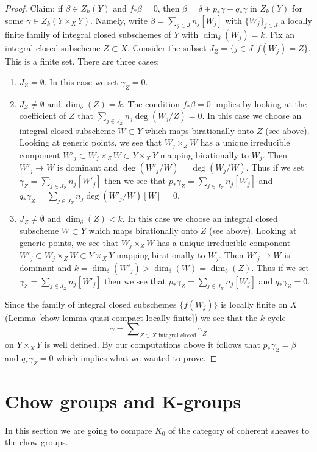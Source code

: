 \begin{proof}
\medskip\noindent
Claim: if $\beta \in Z_k(Y)$ and $f_*\beta = 0$, then
$\beta = \delta + p_*\gamma - q_*\gamma$ in $Z_k(Y)$ for some
$\gamma \in Z_k(Y \times_X Y)$. Namely, write $\beta = \sum_{j \in J} n_j[W_j]$
with $\{W_j\}_{j \in J}$ a locally finite family of integral closed
subschemes of $Y$ with $\dim_\delta(W_j) = k$.
Fix an integral closed subscheme $Z \subset X$. Consider the subset
$J_Z = \{j \in J : f(W_j) = Z\}$. This is a finite set. There are three
cases:
\begin{enumerate}
\item $J_Z = \emptyset$. In this case we set $\gamma_Z = 0$.
\item $J_Z \not = \emptyset$ and $\dim_\delta(Z) = k$.
The condition $f_*\beta = 0$ implies by looking at the
coefficient of $Z$ that $\sum_{j \in J_Z} n_j\deg(W_j/Z) = 0$.
In this case we choose an integral closed subscheme $W \subset Y$
which maps birationally onto $Z$ (see above). Looking at generic
points, we see that $W_j \times_Z W$ has a unique irreducible
component $W'_j \subset W_j \times_Z W \subset Y \times_X Y$
mapping birationally to $W_j$. Then $W'_j \to W$ is dominant
and $\deg(W'_j/W) = \deg(W_j/W)$. Thus if we set
$\gamma_Z = \sum_{j \in J_Z} n_j[W'_j]$
then we see that
$p_*\gamma_Z = \sum_{j \in J_Z} n_j[W_j]$ and
$q_*\gamma_Z = \sum_{j \in J_Z} n_j\deg(W'_j/W)[W] = 0$.
\item $J_Z \not = \emptyset$ and $\dim_\delta(Z) < k$.
In this case we choose an integral closed subscheme $W \subset Y$
which maps birationally onto $Z$ (see above). Looking at generic
points, we see that $W_j \times_Z W$ has a unique irreducible
component $W'_j \subset W_j \times_Z W \subset Y \times_X Y$
mapping birationally to $W_j$. Then $W'_j \to W$ is dominant
and $k = \dim_\delta(W'_j) > \dim_\delta(W) = \dim_\delta(Z)$.
Thus if we set $\gamma_Z = \sum_{j \in J_Z} n_j[W'_j]$
then we see that
$p_*\gamma_Z = \sum_{j \in J_Z} n_j[W_j]$ and
$q_*\gamma_Z = 0$.
\end{enumerate}
Since the family of integral closed subschemes $\{f(W_j)\}$
is locally finite on $X$
(Lemma \ref{chow-lemma-quasi-compact-locally-finite})
we see that the $k$-cycle
$$
\gamma = \sum\nolimits_{Z \subset X\text{ integral closed}} \gamma_Z
$$
on $Y \times_X Y$ is well defined. By our computations above it follows that
$p_*\gamma_Z = \beta$ and $q_*\gamma_Z = 0$ which implies
what we wanted to prove.
\end{proof}

\section{Chow groups and K-groups}
\label{chow-section-chow-and-K}
In this section we are going to compare $K_0$ of the
category of coherent sheaves to the chow groups.

